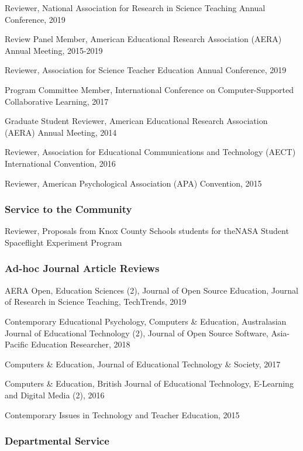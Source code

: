 \documentclass[14,]{article}
\begin{document}
Reviewer, National Association for Research in Science Teaching Annual
Conference, 2019

Review Panel Member, American Educational Research Association (AERA)
Annual Meeting, 2015-2019

Reviewer, Association for Science Teacher Education Annual Conference,
2019

Program Committee Member, International Conference on Computer-Supported
Collaborative Learning, 2017

Graduate Student Reviewer, American Educational Research Association
(AERA) Annual Meeting, 2014

Reviewer, Association for Educational Communications and Technology
(AECT) International Convention, 2016

Reviewer, American Psychological Association (APA) Convention, 2015

\hypertarget{service-to-the-community}{%
\subsubsection{Service to the
Community}\label{service-to-the-community}}

Reviewer, Proposals from Knox County Schools students for theNASA
Student Spaceflight Experiment Program

\hypertarget{ad-hoc-journal-article-reviews}{%
\subsubsection{Ad-hoc Journal Article
Reviews}\label{ad-hoc-journal-article-reviews}}

AERA Open, Education Sciences (2), Journal of Open Source Education,
Journal of Research in Science Teaching, TechTrends, 2019

Contemporary Educational Psychology, Computers \& Education,
Australasian Journal of Educational Technology (2), Journal of Open
Source Software, Asia-Pacific Education Researcher, 2018

Computers \& Education, Journal of Educational Technology \& Society,
2017

Computers \& Education, British Journal of Educational Technology,
E-Learning and Digital Media (2), 2016

Contemporary Issues in Technology and Teacher Education, 2015

\hypertarget{departmental-service}{%
\subsubsection{Departmental Service}\label{departmental-service}}
\end{document}
